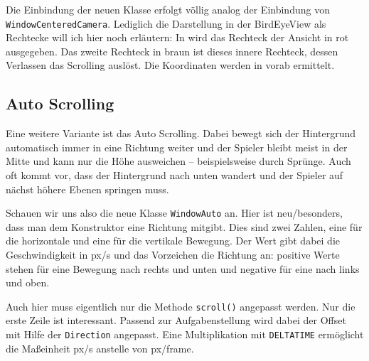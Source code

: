 


Die Einbindung der neuen Klasse erfolgt völlig analog der Einbindung von \texttt{Wind\-ow\-Cen\-tered\-Cam\-era}. Lediglich die Darstellung in der BirdEyeView als Rechtecke will ich hier noch erläutern: In  wird das Rechteck der Ansicht in rot ausgegeben. Das zweite Rechteck in braun ist dieses innere Rechteck, dessen Verlassen das Scrolling auslöst. Die Koordinaten werden in  vorab ermittelt.



\subsection{Auto Scrolling}

Eine weitere Variante ist das Auto Scrolling. Dabei bewegt sich der Hintergrund automatisch immer in eine Richtung weiter und der Spieler bleibt meist in der Mitte und kann nur die Höhe ausweichen -- beispielsweise durch Sprünge. Auch oft kommt vor, dass der Hintergrund nach unten wandert und der Spieler auf nächst höhere Ebenen springen muss. 

Schauen wir uns also die neue Klasse \texttt{WindowAuto} an. Hier ist neu/besonders, dass man dem Konstruktor eine Richtung mitgibt. Dies sind zwei Zahlen, eine für die horizontale und eine für die vertikale Bewegung. Der Wert gibt dabei die Geschwindigkeit in \unit{px/s} und das Vorzeichen die Richtung an: positive Werte stehen für eine Bewegung nach rechts und unten und negative für eine nach links und oben.


Auch hier muss eigentlich nur die Methode \texttt{scroll()} angepasst werden. Nur die erste Zeile ist interessant. Passend zur Aufgabenstellung wird dabei der Offset mit Hilfe der \texttt{Direction} angepasst. Eine Multiplikation mit \texttt{DELTATIME} ermöglicht die Maßeinheit \unit{px/s} anstelle von \unit{px/frame}.

